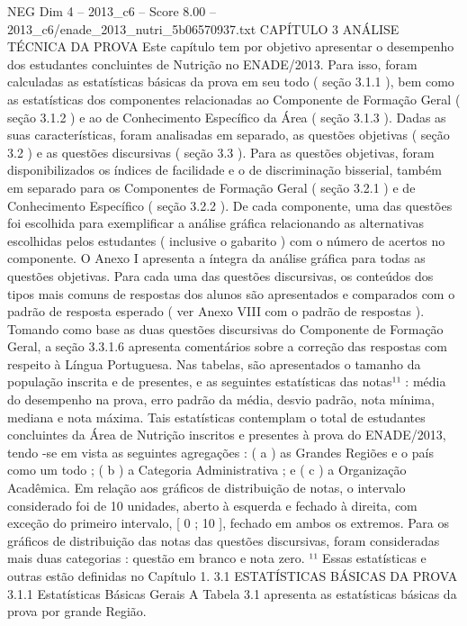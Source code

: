\begin{textsample}{NEG Dim 4 – 2013\_c6 – Score 8.00 – 2013\_c6/enade\_2013\_nutri\_5b06570937.txt}  \label{ex:f4_neg_315}
CAPÍTULO 3 ANÁLISE TÉCNICA DA PROVA Este capítulo tem por objetivo apresentar o desempenho dos estudantes concluintes de Nutrição no ENADE/2013.
Para isso, foram calculadas as estatísticas básicas da prova em seu todo ( seção 3.1.1 ), bem como as estatísticas dos componentes relacionadas ao Componente de Formação Geral ( seção 3.1.2 ) e ao de Conhecimento Específico da Área ( seção 3.1.3 ).
Dadas as suas características, foram analisadas em separado, as questões objetivas ( seção 3.2 ) e as questões discursivas ( seção 3.3 ).
Para as questões objetivas, foram disponibilizados os índices de facilidade e o de discriminação bisserial, também em separado para os Componentes de Formação Geral ( seção 3.2.1 ) e de Conhecimento Específico ( seção 3.2.2 ).
De cada componente, uma das questões foi escolhida para exemplificar a análise gráfica relacionando as alternativas escolhidas pelos estudantes ( inclusive o gabarito ) com o número de acertos no componente.
O Anexo I apresenta a íntegra da análise gráfica para todas as questões objetivas.
Para cada uma das questões discursivas, os conteúdos dos tipos mais comuns de respostas dos alunos são apresentados e comparados com o padrão de resposta esperado ( ver Anexo VIII com o padrão de respostas ).
Tomando como base as duas questões discursivas do Componente de Formação Geral, a seção 3.3.1.6 apresenta comentários sobre a correção das respostas com respeito à Língua Portuguesa.
Nas tabelas, são apresentados o tamanho da população inscrita e de presentes, e as seguintes estatísticas das notas¹¹ : média do desempenho na prova, erro padrão da média, desvio padrão, nota mínima, mediana e nota máxima.
Tais estatísticas contemplam o total de estudantes concluintes da Área de Nutrição inscritos e presentes à prova do ENADE/2013, tendo -se em vista as seguintes agregações : ( a ) as Grandes Regiões e o país como um todo ; ( b ) a Categoria Administrativa ; e ( c ) a Organização Acadêmica.
Em relação aos gráficos de distribuição de notas, o intervalo considerado foi de 10 unidades, aberto à esquerda e fechado à direita, com exceção do primeiro intervalo, [ 0 ; 10 ], fechado em ambos os extremos.
Para os gráficos de distribuição das notas das questões discursivas, foram consideradas mais duas categorias : questão em branco e nota zero. ¹¹ Essas estatísticas e outras estão definidas no Capítulo 1. 3.1 ESTATÍSTICAS BÁSICAS DA PROVA 3.1.1 Estatísticas Básicas Gerais A Tabela 3.1 apresenta as estatísticas básicas da prova por grande Região.

\end{textsample}
